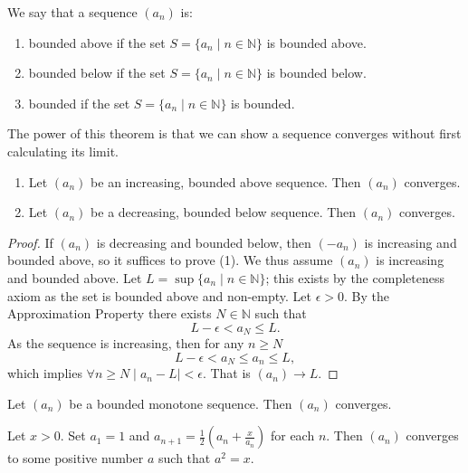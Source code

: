 \documentclass[11pt]{article}
\begin{document}
\begin{definition}\label{2.3.3}
	We say that a sequence $(a_n)$ is:
	\begin{enumerate}
		\item bounded above if the set $S = \{a_n \mid n \in \mathbb{N}\}$ is bounded above.
		\item bounded below if the set $S = \{a_n \mid n \in \mathbb{N}\}$ is bounded below.
		\item bounded if the set $S = \{a_n \mid n \in \mathbb{N}\}$ is bounded.
	\end{enumerate}
\end{definition}

\begin{theorem} \label{2.3.4}
	The power of this theorem is that we can show a sequence converges without first calculating its limit.
	\begin{enumerate}
		\item Let $(a_n)$ be an increasing, bounded above sequence. Then $(a_n)$ converges.
		\item Let $(a_n)$ be a decreasing, bounded below sequence. Then $(a_n)$ converges.
	\end{enumerate}
\end{theorem}

\begin{proof}
	If $(a_n)$ is decreasing and bounded below, then $(-a_n)$ is increasing and bounded above, so it suffices to prove (1). We thus assume $(a_n)$ is increasing and bounded above.
	Let $L = \sup \{a_n \mid n \in \mathbb{N}\}$; this exists by the completeness axiom as the set is bounded above and non-empty. Let $\epsilon > 0$. By the Approximation Property there exists $N \in \mathbb{N}$ such that
	\[
		L - \epsilon < a_N \leq L.
	\]
	As the sequence is increasing, then for any $n \geq N$
	\[
		L - \epsilon < a_N \leq a_n \leq L,
	\]
	which implies $\forall n \geq N \mid a_n - L \mid < \epsilon$. That is $(a_n)
		\to L$.
\end{proof}

\begin{corollary}\label{2.3.5}
	Let $(a_n)$ be a bounded monotone sequence. Then $(a_n)$ converges.
\end{corollary}

\begin{example}\label{2.3.6}
	Let $x > 0$. Set $a_1 = 1$ and $a_{n+1} = \frac{1}{2} \left( a_n + \frac{x}{a_n} \right)$ for each $n$. Then $(a_n)$ converges to some positive number $a$ such that $a^2 = x$.
\end{example}
\end{document}
